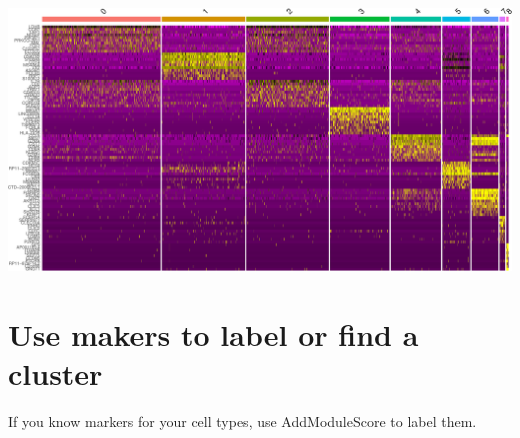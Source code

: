 \documentclass[
]{book}
\begin{document}
\includegraphics{scRNAseqInR_Doco_files/figure-latex/clusterHeatmap-1.pdf}

\hypertarget{use-makers-to-label-or-find-a-cluster}{%
\section{Use makers to label or find a cluster}\label{use-makers-to-label-or-find-a-cluster}}

If you know markers for your cell types, use AddModuleScore to label them.
\end{document}
